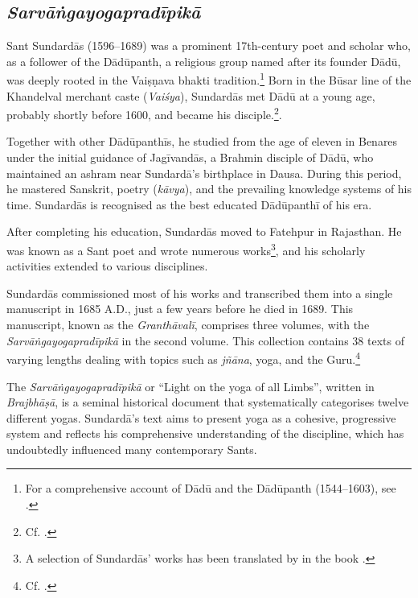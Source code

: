 \subsection{\emph{Sarvāṅgayogapradīpikā}}

Sant Sundardās (1596–1689) was a prominent 17th-century poet and scholar who, as a follower of the Dādūpanth, a religious group named after its founder Dādū, was deeply rooted in the Vaiṣṇava bhakti tradition.\footnote{For a comprehensive account of Dādū and the Dādūpanth (1544–1603), see \citeauthor[2023: 71–77]{horstmann2023shrine}.} Born in the Būsar line of the Khandelval merchant caste (\textit{Vaiśya}), Sundardās met Dādū at a young age, probably shortly before 1600, and became his disciple.\footnote{Cf. \citeauthor[2023: 86]{horstmann2023shrine}.}.

Together with other Dādūpanthīs, he studied from the age of eleven in Benares under the initial guidance of Jagīvandās, a Brahmin disciple of Dādū, who maintained an ashram near Sundardā's birthplace in Dausa. During this period, he mastered Sanskrit, poetry (\textit{kāvya}), and the prevailing knowledge systems of his time. Sundardās is recognised as the best educated Dādūpanthī of his era.

After completing his education, Sundardās moved to Fatehpur in Rajasthan. He was known as a Sant poet and wrote numerous works\footnote{A selection of Sundardās' works has been translated by \citeauthor{horstmann2023shrine} in the book .}, and his scholarly activities extended to various disciplines.

Sundardās commissioned most of his works and transcribed them into a single manuscript in 1685 A.D., just a few years before he died in 1689. This manuscript, known as the \emph{Granthāvalī}, comprises three volumes, with the \emph{Sarvāṅgayogapradīpikā} in the second volume. This collection contains 38 texts of varying lengths dealing with topics such as \textit{jñāna}, yoga, and the Guru.\footnote{Cf. \citeauthor[2014: 685]{burger2014sarvangayogapradipika}.}

The \emph{Sarvāṅgayogapradīpikā} or ``Light on the yoga of all Limbs'', written in \textit{Brajbhāṣā}, is a seminal historical document that systematically categorises twelve different yogas. Sundardā's text aims to present yoga as a cohesive, progressive system and reflects his comprehensive understanding of the discipline, which has undoubtedly influenced many contemporary Sants.

